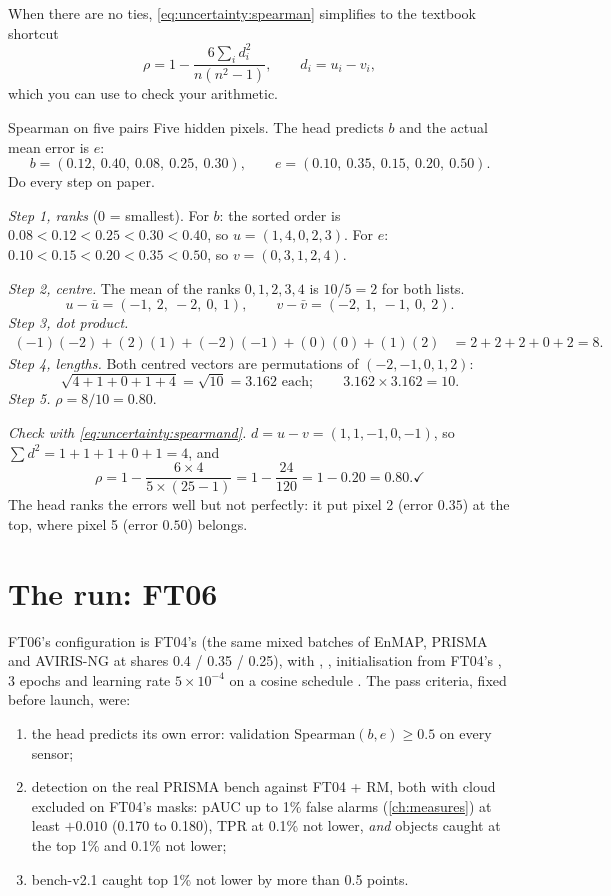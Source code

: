 When there are no ties, \cref{eq:uncertainty:spearman} simplifies to the textbook shortcut
\begin{equation}\label{eq:uncertainty:spearmand}
\rho = 1 - \frac{6\sum_i d_i^2}{n(n^2-1)}, \qquad d_i = u_i - v_i,
\end{equation}
which you can use to check your arithmetic.

\begin{worked}[label={we:uncertainty:spearman5}]{Spearman on five pairs}
Five hidden pixels. The head predicts $b$ and the actual mean error is $e$:
\[
b = (0.12,\ 0.40,\ 0.08,\ 0.25,\ 0.30),\qquad e=(0.10,\ 0.35,\ 0.15,\ 0.20,\ 0.50).
\]
Do every step on paper.

\emph{Step 1, ranks} (0 = smallest). For $b$: the sorted order is $0.08<0.12<0.25<0.30<0.40$, so
$u=(1,4,0,2,3)$. For $e$: $0.10<0.15<0.20<0.35<0.50$, so $v=(0,3,1,2,4)$.

\emph{Step 2, centre.} The mean of the ranks $0,1,2,3,4$ is $10/5=2$ for both lists.
\[
u-\bar u = (-1,\ 2,\ -2,\ 0,\ 1),\qquad v-\bar v=(-2,\ 1,\ -1,\ 0,\ 2).
\]
\emph{Step 3, dot product.}
\begin{align*}
(-1)(-2) + (2)(1) + (-2)(-1) + (0)(0) + (1)(2) &= 2 + 2 + 2 + 0 + 2 = 8.
\end{align*}
\emph{Step 4, lengths.} Both centred vectors are permutations of $(-2,-1,0,1,2)$:
\[
\sqrt{4+1+0+1+4} = \sqrt{10} = 3.162 \text{ each};\qquad 3.162\times 3.162 = 10.
\]
\emph{Step 5.} $\rho = 8/10 = 0.80$.

\emph{Check with \cref{eq:uncertainty:spearmand}.} $d=u-v=(1,1,-1,0,-1)$, so $\sum d^2=1+1+1+0+1=4$, and
\[
\rho = 1-\frac{6\times 4}{5\times(25-1)} = 1-\frac{24}{120} = 1-0.20 = 0.80. \checkmark
\]
The head ranks the errors well but not perfectly: it put pixel 2 (error $0.35$) at the top, where pixel 5
(error $0.50$) belongs.
\end{worked}

\section{The run: FT06}\label{sec:uncertainty:ft06}

FT06's configuration is FT04's (the same mixed batches of EnMAP, PRISMA and AVIRIS-NG at shares 0.4 / 0.35 /
0.25), with , , initialisation from FT04's , 3
epochs and learning rate $5\times10^{-4}$ on a cosine schedule
. The pass criteria, fixed before
launch, were:
\begin{enumerate}
\item the head predicts its own error: validation Spearman$(b,e)\ge 0.5$ on every sensor;
\item detection on the real PRISMA bench against FT04 + RM, both with cloud excluded on FT04's masks: pAUC up
  to 1\% false alarms (\cref{ch:measures}) at least $+0.010$ (0.170 to 0.180), TPR at 0.1\% not lower,
  \emph{and} objects caught at the top 1\% and 0.1\% not lower;
\item bench-v2.1 caught top 1\% not lower by more than 0.5 points.
\end{enumerate}

